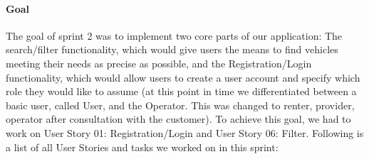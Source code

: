 \paragraph{Goal} The goal of sprint 2 was to implement two core parts of our application: The search/filter functionality, which would give users the means to find vehicles meeting their needs as precise as possible, and the Registration/Login functionality, which would allow users to create a user account and specify which role they would like to assume (at this point in time we differentiated between a basic user, called User, and the Operator. This was changed to renter, provider, operator after consultation with the customer). To achieve this goal, we had to work on User Story 01: Registration/Login and User Story 06: Filter. Following is a list of all User Stories and tasks we worked on in this sprint: \\

